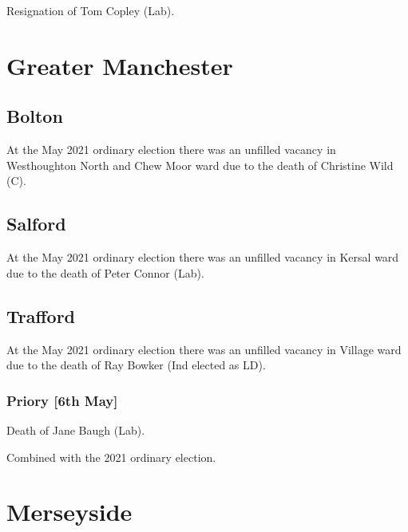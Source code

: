\documentclass[a4paper,openany]{book}
\begin{document}
\begin{resultsiii}

Resignation of Tom Copley (Lab).

\section{Greater Manchester}

\subsection*{Bolton}

At the May 2021 ordinary election there was an unfilled vacancy in Westhoughton North and Chew Moor ward due to the death of Christine Wild (C).

\subsection*{Salford}

At the May 2021 ordinary election there was an unfilled vacancy in Kersal ward due to the death of Peter Connor (Lab).

\subsection*{Trafford}

At the May 2021 ordinary election there was an unfilled vacancy in Village ward due to the death of Ray Bowker (Ind elected as LD).

\subsubsection*{Priory \hspace*{\fill}\nolinebreak[1]%
	\enspace\hspace*{\fill}
	[6th May]}


Death of Jane Baugh (Lab).

Combined with the 2021 ordinary election.

\section{Merseyside}


\end{resultsiii}
\end{document}
